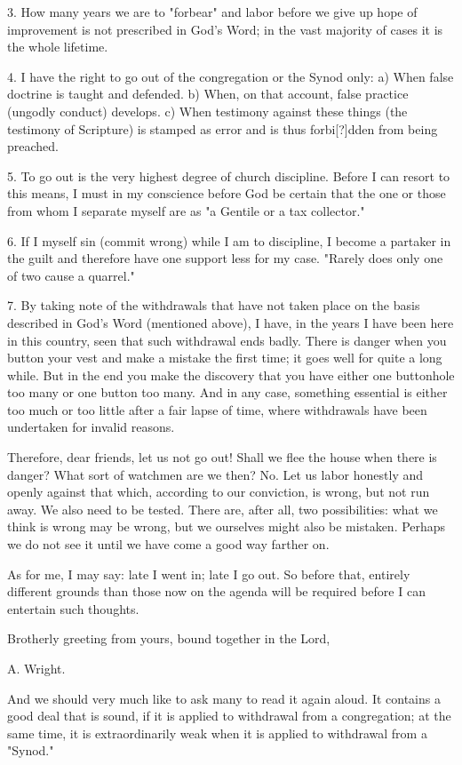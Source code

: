 {3. How many years we are to "forbear" and labor before we give up hope of improvement is not prescribed in God’s Word; in the vast majority of cases it is the whole lifetime.

4. I have the right to go out of the congregation or the Synod only:
   a) When false doctrine is taught and defended.
   b) When, on that account, false practice (ungodly conduct) develops.
   c) When testimony against these things (the testimony of Scripture) is stamped as error and is thus forbi[?]dden from being preached.

5. To go out is the very highest degree of church discipline. Before I can resort to this means, I must in my conscience before God be certain that the one or those from whom I separate myself are as "a Gentile or a tax collector."

6. If I myself sin (commit wrong) while I am to discipline, I become a partaker in the guilt and therefore have one support less for my case.
   "Rarely does only one of two cause a quarrel."

7. By taking note of the withdrawals that have not taken place on the basis described in God’s Word (mentioned above), I have, in the years I have been here in this country, seen that such withdrawal ends badly. There is danger when you button your vest and make a mistake the first time; it goes well for quite a long while. But in the end you make the discovery that you have either one buttonhole too many or one button too many. And in any case, something essential is either too much or too little after a fair lapse of time, where withdrawals have been undertaken for invalid reasons.

Therefore, dear friends, let us not go out! Shall we flee the house when there is danger? What sort of watchmen are we then? No. Let us labor honestly and openly against that which, according to our conviction, is wrong, but not run away. We also need to be tested. There are, after all, two possibilities: what we think is wrong may be wrong, but we ourselves might also be mistaken. Perhaps we do not see it until we have come a good way farther on.

As for me, I may say: late I went in; late I go out. So before that, entirely different grounds than those now on the agenda will be required before I can entertain such thoughts.

Brotherly greeting from yours, bound together in the Lord,

A. Wright.}

And we should very much like to ask many to read it again aloud. It contains a good deal that is sound, if it is applied to withdrawal from a congregation; at the same time, it is extraordinarily weak when it is applied to withdrawal from a "Synod."

